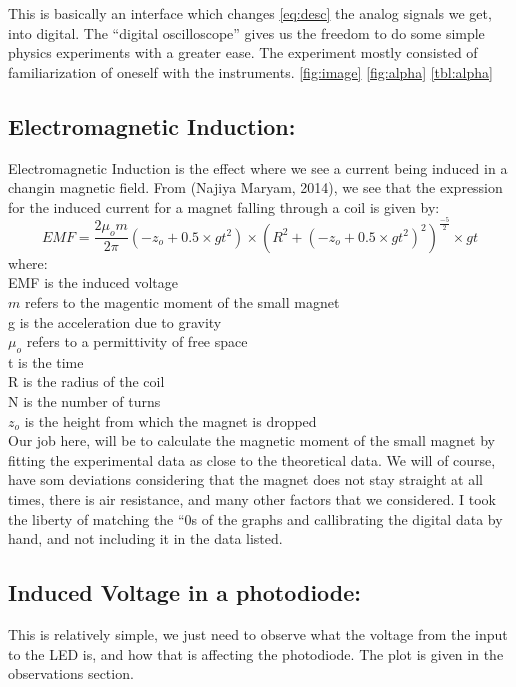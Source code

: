 \documentclass{double}
\begin{document}
This is basically an interface which changes \ref{eq:desc} the analog signals we get, into digital. The ``digital oscilloscope'' gives us the freedom to do some simple physics experiments with a greater ease. The experiment mostly consisted of familiarization of oneself with the instruments. \ref{fig:image} \ref{fig:alpha} \ref{tbl:alpha}

\subsection{Electromagnetic Induction:}

Electromagnetic Induction is the effect where we see a current being induced in a changin magnetic field. From (Najiya Maryam, 2014), we see that the expression for the induced current for a magnet falling through a coil is given by:
\[ EMF = \frac{2\mu_o m}{2\pi}(-z_o+0.5\times gt^2) \times (R^2+(-z_o+0.5\times gt^2)^2)^\frac{-5}{2}\times gt \]
where:\\
EMF is the induced voltage\\
\(m\) refers to the magentic moment of the small magnet\\
g is the acceleration due to gravity\\
\(\mu_o\) refers to a permittivity of free space\\
t is the time\\
R is the radius of the coil\\
N is the number of turns\\
\(z_o\) is the height from which the magnet is dropped\\
Our job here, will be to calculate the magnetic moment of the small magnet by fitting the experimental data as close to the theoretical data. We will of course, have som deviations considering that the magnet does not stay straight at all times, there is air resistance, and many other factors that we considered. I took the liberty of matching the ``0s of the graphs and callibrating the digital data by hand, and not including it in the data listed.

\subsection{Induced Voltage in a photodiode:}

This is relatively simple, we just need to observe what the voltage from the input to the LED is, and how that is affecting the photodiode. The plot is given in the observations section.
\end{document}
